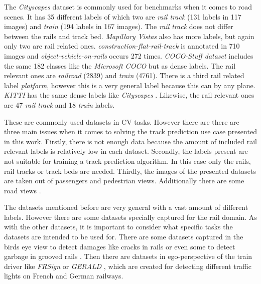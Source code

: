 The \textit{Cityscapes} dataset \cite{cityscapes2016} is commonly used for benchmarks when it comes to road scenes.
It has 35 different labels of which two are \textit{rail track} (131 labels in 117 images) and \textit{train} (194 labels in 167 images).
The \textit{rail track} does not differ between the rails and track bed.
\textit{Mapillary Vistas} \cite{mapillaryVistas2017} also has more labels, but again only two are rail related ones.
\textit{construction-flat-rail-track} is annotated in 710 images and \textit{object-vehicle-on-rails} occurs 272 times.
\textit{COCO-Stuff dataset} \cite{COCO-StuffDataset} includes the same 182 classes like the \textit{Microsoft COCO} \cite{Lin2014MicrosoftCC} but as dense labels.
The rail relevant ones are \textit{railroad} (2839) and \textit{train} (4761).
There is a third rail related label \textit{platform}, however this is a very general label because this can by any plane.
\textit{KITTI} \cite{kittiDataset2018} has the same dense labels like \textit{Cityscapes} \cite{cityscapes2016}.
Likewise, the rail relevant ones are 47 \textit{rail track} and 18 \textit{train} labels.

These are commonly used datasets in \ac{CV} tasks. However there are there are three main issues when it comes to solving the track prediction use case presented in this work.
Firstly, there is not enough data because the amount of included rail relevant labels is relatively low in each dataset.
Secondly, the labels present are not suitable for training a track prediction algorithm. In this case only the rails, rail tracks or track beds are needed.
Thirdly, the images of the presented datasets are taken out of passengers and pedestrian views. Additionally there are some road views \cite{Hadded.2022}.

The datasets mentioned before are very general with a vast amount of different labels.
However there are some datasets specially captured for the rail domain.
As with the other datasets, it is important to consider what specific tasks the datasets are intended to be used for.
There are some datasets captured in the birds eye view to detect damages like cracks in rails \cite{rail5k2021} \cite{ma2024cross} or even some to detect garbage in grooved rails \cite{Huang_2021}. Then there are datasets in ego-perspective of the train driver like \textit{FRSign} \cite{Harb2020FRSignAL} or \textit{GERALD} \cite{leibner2023gerald}, which are created for detecting different traffic lights on French and German railways.

